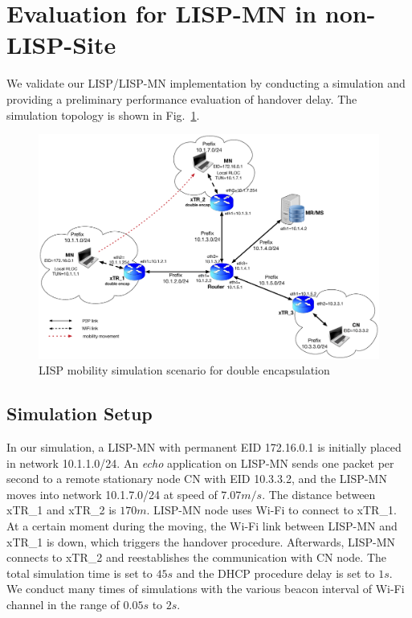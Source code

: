 \section{Evaluation for LISP-MN in non-LISP-Site}
\label{sec:ns3_evaluation_lispmn}
We validate our LISP/LISP-MN implementation by conducting a simulation and providing a preliminary performance evaluation of handover delay. The simulation topology is shown in Fig.~\ref{sim_scenario}.
\begin{figure}[!th]
	\centering
	\includegraphics[width=\textwidth]{Pics/mobility_through_subnets_2_encap_topo}
	\caption{LISP mobility simulation scenario for double encapsulation}
	\label{sim_scenario}
\end{figure}

\subsection{Simulation Setup}
\label{subsec:ns3_setup_lispmn}
In our simulation, a LISP-MN with permanent EID 172.16.0.1 is initially placed in network 10.1.1.0/24. An \emph{echo} application on LISP-MN sends one packet per second to a remote stationary node CN with EID 10.3.3.2, and the LISP-MN moves into network 10.1.7.0/24 at speed of $7.07m/s$. The distance between xTR\_1 and xTR\_2 is $170m$. LISP-MN node uses Wi-Fi to connect to xTR\_1. At a certain moment during the moving, the Wi-Fi link between LISP-MN and xTR\_1 is down, which triggers the handover procedure. Afterwards, LISP-MN connects to xTR\_2 and reestablishes the communication with CN node. The total simulation time is set to $45s$ and the DHCP procedure delay is set to $1s$. We conduct many times of simulations with the various beacon interval of Wi-Fi channel in the range of $0.05s$ to $2s$.

